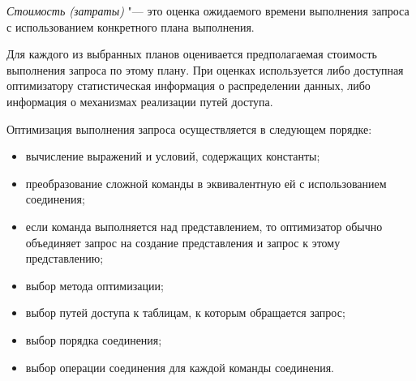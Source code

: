 \begin{definition}
	\emph{Стоимость (затраты)} "--- это оценка ожидаемого времени выполнения запроса с использованием конкретного плана выполнения.
\end{definition}

Для каждого из выбранных планов оценивается предполагаемая стоимость выполнения запроса по этому плану.
При оценках используется либо доступная оптимизатору статистическая информация о распределении данных, либо информация о механизмах реализации путей доступа.

Оптимизация выполнения запроса осуществляется в следующем порядке:
\begin{itemize}
	\item вычисление выражений и условий, содержащих константы;
	\item преобразование сложной команды в эквивалентную ей с использованием соединения;
	\item если команда выполняется над представлением, то оптимизатор обычно объединяет запрос на создание представления и запрос к этому представлению;
	\item выбор метода оптимизации;
	\item выбор путей доступа к таблицам, к которым обращается запрос;
	\item выбор порядка соединения;
	\item выбор операции соединения для каждой команды соединения.
\end{itemize}
